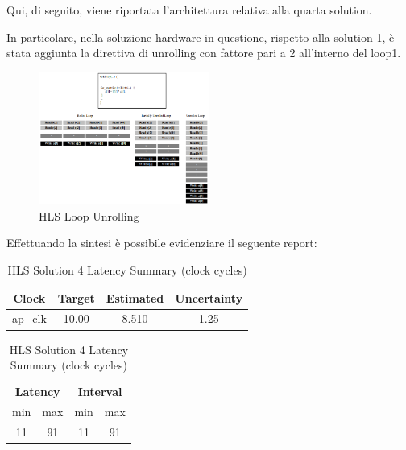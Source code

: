 Qui, di seguito, viene riportata l'architettura relativa alla quarta solution.



In particolare, nella soluzione hardware in questione, rispetto alla solution 1, è stata aggiunta la direttiva di unrolling con fattore pari a 2 all'interno del loop1.

\begin{figure}[H]
	\centering
	\includegraphics[width=0.5\textwidth]{solutions/s4/unrolling.png}
	\caption{HLS Loop Unrolling}
\end{figure}

Effettuando la sintesi è possibile evidenziare il seguente report:\\

\begin{table}[H]
	\centering
	\begin{minipage}[t]{0.45\linewidth}
		\centering
		\begin{tabular}{|c|c|c|c|}
			\hline
			\textbf{Clock} & \textbf{Target} & \textbf{Estimated} & \textbf{Uncertainty} \\
			\hline
			ap\_clk & 10.00 & 8.510 & 1.25 \\
			\hline
		\end{tabular}
		\caption{HLS Solution 4 Timing Summary (ns)}
		\label{tab:hls-solution-4-timing-summary}
	\end{minipage}
	\hfill
	\begin{minipage}[t]{0.45\linewidth}
		\centering
		\begin{tabular}{|c|c|c|c|}
			\hline
			\multicolumn{2}{|c|}{\textbf{Latency}} & \multicolumn{2}{|c|}{\textbf{Interval}} \\
			min & max & min & max \\
			\hline
			11 & 91 & 11 & 91 \\
			\hline
		\end{tabular}
		\caption{HLS Solution 4 Latency Summary (clock cycles)}
		\label{tab:hls-solution-4-latency-summary}
	\end{minipage}
\end{table}

